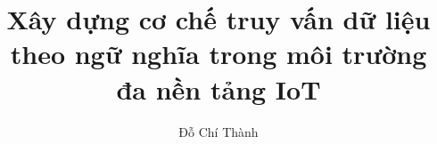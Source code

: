 \documentclass[a4paper,12pt,3p]{report}
\begin{document}
\title{\Large {\bf Xây dựng cơ chế truy vấn dữ liệu theo ngữ nghĩa trong môi trường đa nền tảng IoT}\\
 \vspace*{7mm}
}


\author{Đỗ Chí Thành}




\normallinespacing
\maketitle

\preface






\body









%
%


%
%
%
%
\end{document}
